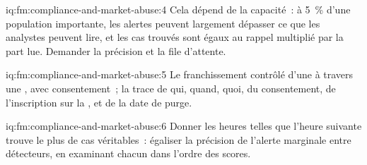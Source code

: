 \begin{solution}{iq:fm:compliance-and-market-abuse:4}
Cela dépend de la capacité~: à 5~\% d'une population importante, les alertes peuvent largement dépasser ce que les analystes peuvent lire, et les cas trouvés sont égaux au rappel multiplié par la
part lue. Demander la précision et la file d'attente.
\end{solution}

\begin{solution}{iq:fm:compliance-and-market-abuse:5}
Le franchissement contrôlé d'une  à travers une , avec consentement~; la trace de qui, quand, quoi, du consentement, de l'inscription sur la ,
et de la date de purge.
\end{solution}

\begin{solution}{iq:fm:compliance-and-market-abuse:6}
Donner les heures telles que l'heure suivante trouve le plus de cas véritables~: égaliser la précision de l'alerte marginale entre détecteurs, en examinant chacun dans l'ordre
des scores.
\end{solution}
